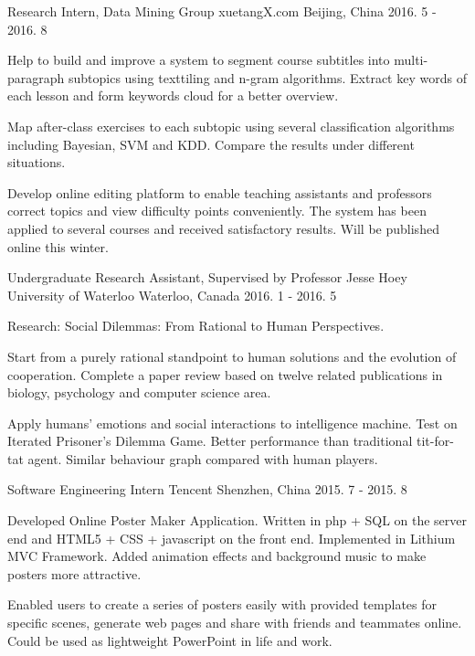 \begin{cventries}
  \cventry
    {Research Intern, Data Mining Group}
    {xuetangX.com}
    {Beijing, China}
    {2016. 5 - 2016. 8}
    {
      \begin{cvitems}
      \item{Help to build and improve a system to segment course subtitles into multi-paragraph subtopics using texttiling and n-gram algorithms. Extract key words of each lesson and form keywords cloud for a better overview.}
        \item{Map after-class exercises to each subtopic using several classification algorithms including Bayesian, SVM and KDD. Compare the results under different situations.}
        \item{Develop online editing platform to enable teaching assistants and professors correct topics and view difficulty points conveniently. The system has been applied to several courses and received satisfactory results. Will be published online this winter.}
      \end{cvitems}
    }
  \cventry
    {Undergraduate Research Assistant, Supervised by Professor Jesse Hoey}
    {University of Waterloo}
    {Waterloo, Canada}
    {2016. 1 - 2016. 5}
    {
      \begin{cvitems}
        \item {Research: Social Dilemmas: From Rational to Human Perspectives.}
        \item {Start from a purely rational standpoint to human solutions and the evolution of cooperation. Complete a paper review based on twelve related publications in biology, psychology and computer science area.}
        \item {Apply humans' emotions and social interactions to intelligence machine. Test on Iterated Prisoner's Dilemma Game. Better performance than traditional tit-for-tat agent. Similar behaviour graph compared with human players.}
      \end{cvitems}
    }
  \cventry
    {Software Engineering Intern}
    {Tencent}
    {Shenzhen, China}
    {2015. 7 - 2015. 8}
    {
      \begin{cvitems}
        \item {Developed Online Poster Maker Application. Written in php + SQL on the server end and HTML5 + CSS + javascript on the front end. Implemented in Lithium MVC Framework. Added animation effects and background music to make posters more attractive.}
        \item {Enabled users to create a series of posters easily with provided templates for specific scenes, generate web pages and share with friends and teammates online. Could be used as lightweight PowerPoint in life and work.}

\end{cvitems}}
\end{cventries}
